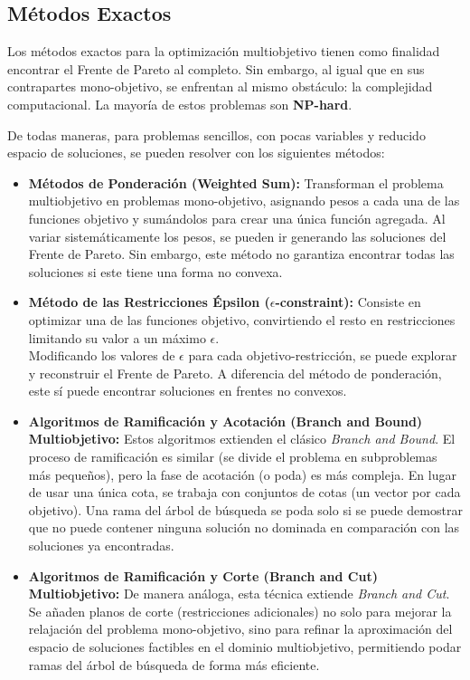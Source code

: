 \documentclass[12pt,a4paper]{book}
\begin{document}
\subsection{Métodos Exactos}

Los métodos exactos para la optimización multiobjetivo tienen como finalidad encontrar el Frente de Pareto al completo. Sin embargo, al igual que en sus contrapartes mono-objetivo, se enfrentan al mismo obstáculo: la complejidad computacional. La mayoría de estos problemas son \textbf{NP-hard}.

De todas maneras, para problemas sencillos, con pocas variables y reducido espacio de soluciones, se pueden resolver  con los siguientes métodos:

\begin{itemize}
    \item \textbf{Métodos de Ponderación (Weighted Sum):} Transforman el problema multiobjetivo en problemas mono-objetivo, asignando pesos a cada una de las funciones objetivo y sumándolos para crear una única función agregada. Al variar sistemáticamente los pesos, se pueden ir generando las soluciones del Frente de Pareto. Sin embargo, este método no garantiza encontrar todas las soluciones  si este tiene una forma no convexa.

    \item \textbf{Método de las Restricciones Épsilon ($\epsilon$-constraint):} Consiste en optimizar una de las funciones objetivo, convirtiendo el resto en restricciones limitando su valor a un máximo $\epsilon$.\\
    Modificando los valores de $\epsilon$ para cada objetivo-restricción, se puede explorar y reconstruir el Frente de Pareto. A diferencia del método de ponderación, este sí puede encontrar soluciones en frentes no convexos.

    \item \textbf{Algoritmos de Ramificación y Acotación (Branch and Bound) Multiobjetivo:} Estos algoritmos extienden el clásico \textit{Branch and Bound}. El proceso de ramificación es similar (se divide el problema en subproblemas más pequeños), pero la fase de acotación (o poda) es más compleja. En lugar de usar una única cota, se trabaja con conjuntos de cotas (un vector por cada objetivo). Una rama del árbol de búsqueda se poda solo si se puede demostrar que no puede contener ninguna solución no dominada en comparación con las soluciones ya encontradas.

    \item \textbf{Algoritmos de Ramificación y Corte (Branch and Cut) Multiobjetivo:} De manera análoga, esta técnica extiende \textit{Branch and Cut}. Se añaden planos de corte (restricciones adicionales) no solo para mejorar la relajación del problema mono-objetivo, sino para refinar la aproximación del espacio de soluciones factibles en el dominio multiobjetivo, permitiendo podar ramas del árbol de búsqueda de forma más eficiente.
\end{itemize}
\end{document}
